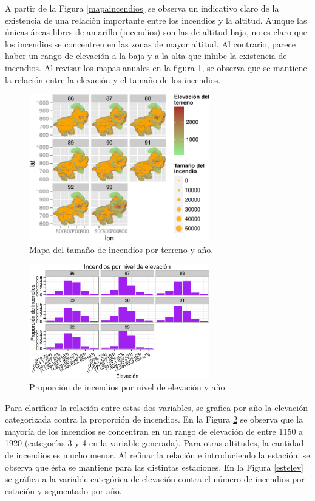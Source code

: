 \documentclass[12,]{article}
\begin{document}
A partir de la Figura \ref{mapaincendios} se observa un indicativo claro
de la existencia de una relación importante entre los incendios y la
altitud. Aunque las únicas áreas libres de amarillo (incendios) son las
de altitud baja, no es claro que los incendios se concentren en las
zonas de mayor altitud. Al contrario, parece haber un rango de elevación
a la baja y a la alta que inhibe la existencia de incendios. Al revisar
los mapas anuales en la figura \ref{mapaincendiosanio}, se observa que
se mantiene la relación entre la elevación y el tamaño de los incendios.

\begin{figure}[H]
\centering
\includegraphics[width=0.7\textwidth]{tarea2_files/figure-latex/unnamed-chunk-3-1.pdf}
\caption{Mapa del tamaño de incendios por terreno y año.}
\label{mapaincendiosanio}
\end{figure}

\begin{figure}[H]
\centering
\includegraphics[width=0.7\textwidth]{tarea2_files/figure-latex/unnamed-chunk-4-1.pdf}
\caption{Proporción de incendios por nivel de elevación y año.}
\label{barraincendios}
\end{figure}

Para clarificar la relación entre estas dos variables, se grafica por
año la elevación categorizada contra la proporción de incendios. En la
Figura \ref{barraincendios} se observa que la mayoría de los incendios
se concentran en un rango de elevación de entre 1150 a 1920 (categorías
3 y 4 en la variable generada). Para otras altitudes, la cantidad de
incendios es mucho menor. Al refinar la relación e introduciendo la
estación, se observa que ésta se mantiene para las distintas estaciones.
En la Figura \ref{estelev} se gráfica a la variable categórica de
elevación contra el número de incendios por estación y segmentado por
año.
\end{document}
